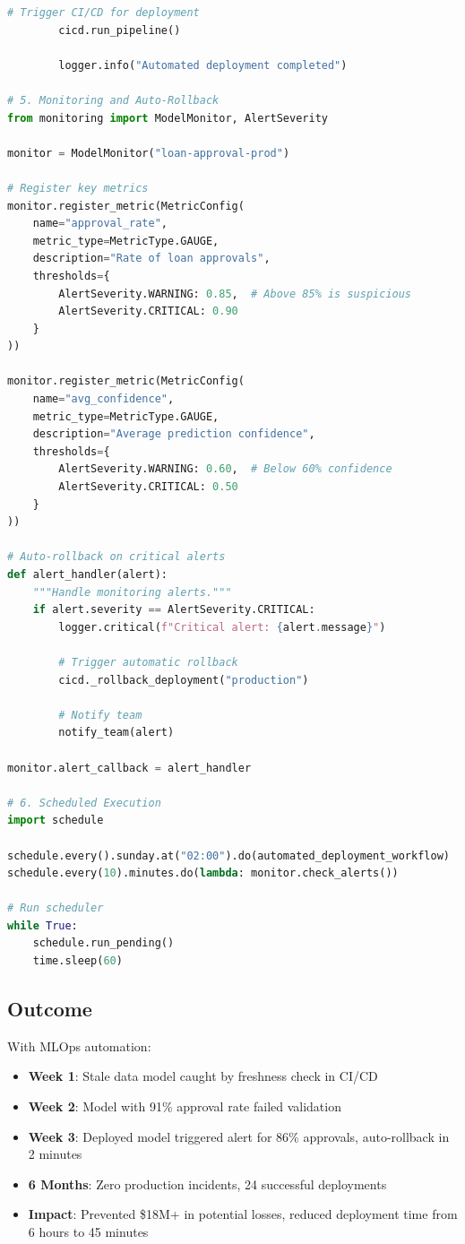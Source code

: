 \begin{lstlisting}[language=Python, caption={Complete MLOps Automation}]
        # Trigger CI/CD for deployment
        cicd.run_pipeline()

        logger.info("Automated deployment completed")

# 5. Monitoring and Auto-Rollback
from monitoring import ModelMonitor, AlertSeverity

monitor = ModelMonitor("loan-approval-prod")

# Register key metrics
monitor.register_metric(MetricConfig(
    name="approval_rate",
    metric_type=MetricType.GAUGE,
    description="Rate of loan approvals",
    thresholds={
        AlertSeverity.WARNING: 0.85,  # Above 85% is suspicious
        AlertSeverity.CRITICAL: 0.90
    }
))

monitor.register_metric(MetricConfig(
    name="avg_confidence",
    metric_type=MetricType.GAUGE,
    description="Average prediction confidence",
    thresholds={
        AlertSeverity.WARNING: 0.60,  # Below 60% confidence
        AlertSeverity.CRITICAL: 0.50
    }
))

# Auto-rollback on critical alerts
def alert_handler(alert):
    """Handle monitoring alerts."""
    if alert.severity == AlertSeverity.CRITICAL:
        logger.critical(f"Critical alert: {alert.message}")

        # Trigger automatic rollback
        cicd._rollback_deployment("production")

        # Notify team
        notify_team(alert)

monitor.alert_callback = alert_handler

# 6. Scheduled Execution
import schedule

schedule.every().sunday.at("02:00").do(automated_deployment_workflow)
schedule.every(10).minutes.do(lambda: monitor.check_alerts())

# Run scheduler
while True:
    schedule.run_pending()
    time.sleep(60)
\end{lstlisting}

\subsection{Outcome}

With MLOps automation:
\begin{itemize}
    \item \textbf{Week 1}: Stale data model caught by freshness check in CI/CD
    \item \textbf{Week 2}: Model with 91\% approval rate failed validation
    \item \textbf{Week 3}: Deployed model triggered alert for 86\% approvals, auto-rollback in 2 minutes
    \item \textbf{6 Months}: Zero production incidents, 24 successful deployments
    \item \textbf{Impact}: Prevented \$18M+ in potential losses, reduced deployment time from 6 hours to 45 minutes
\end{itemize}

